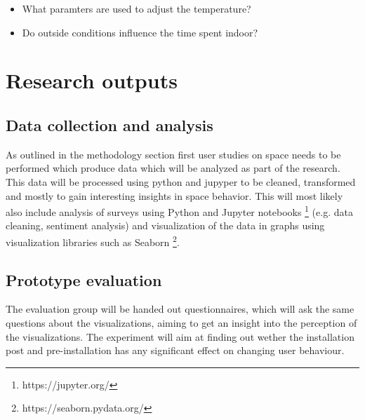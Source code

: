 \begin{itemize}
  \item What paramters are used to adjust the temperature?
  \item Do outside conditions influence the time spent indoor?
\end{itemize}

\section{Research outputs}

\subsection{Data collection and analysis}

As outlined in the methodology section first user studies on space needs to be performed which produce data which will be analyzed as part of the research. This data will be processed using python and jupyper to be cleaned, transformed and mostly to gain interesting insights in space behavior. This will most likely also include analysis of surveys using Python and Jupyter notebooks \footnote{https://jupyter.org/} (e.g. data cleaning, sentiment analysis) and visualization of the data in graphs using visualization libraries such as Seaborn \footnote{https://seaborn.pydata.org/}.

\subsection{Prototype evaluation}

The evaluation group will be handed out questionnaires, which will ask the same questions about the visualizations, aiming to get an insight into the perception of the visualizations. The experiment will aim at finding out wether the installation post and pre-installation has any significant effect on changing user behaviour.
